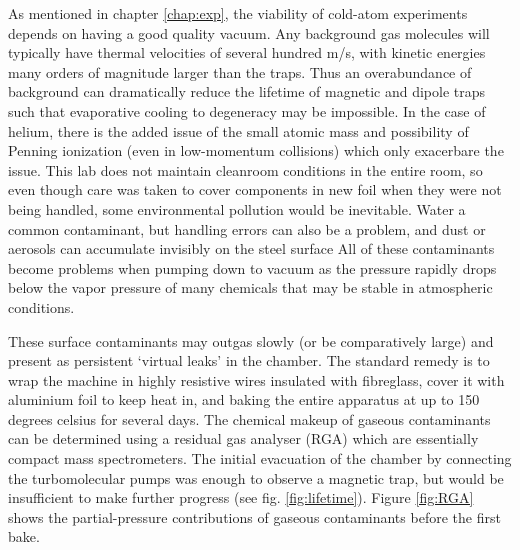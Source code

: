 		As mentioned in chapter \ref{chap:exp}, the viability of cold-atom experiments depends on having a good quality vacuum.
		Any background gas molecules will typically have thermal velocities of several hundred m/s, with kinetic energies many orders of magnitude larger than the traps.
		Thus an overabundance of background can dramatically reduce the lifetime of magnetic and dipole traps such that evaporative cooling to degeneracy may be impossible.
		In the case of helium, there is the added issue of the small atomic mass and possibility of Penning ionization (even in low-momentum collisions) which only exacerbare the issue.
		This lab does not maintain cleanroom conditions in the entire room, so even though care was taken to cover components in new foil when they were not being handled, some environmental pollution would be inevitable.
		Water a common contaminant, but handling errors can also be a problem, and dust or aerosols can accumulate invisibly on the steel surface
		All of these contaminants become problems when pumping down to vacuum as the pressure rapidly drops below the vapor pressure of many chemicals that may be stable in atmospheric conditions.
	
		These surface contaminants may outgas slowly (or be comparatively large) and present as persistent `virtual leaks' in the chamber.
		The standard remedy is to wrap the machine in highly resistive wires insulated with fibreglass, cover it with aluminium foil to keep heat in, and baking the entire apparatus at up to 150 degrees celsius for several days.
		The chemical makeup of gaseous contaminants can be determined using a residual gas analyser (RGA) which are essentially compact mass spectrometers.
		The initial evacuation of the chamber by connecting the turbomolecular pumps was enough to observe a magnetic trap, but would be insufficient to make further progress (see fig. \ref{fig:lifetime}).
		Figure \ref{fig:RGA} shows the partial-pressure contributions of gaseous contaminants before the first bake.





	
